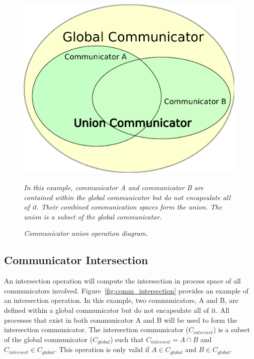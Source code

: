 \documentclass[letterpaper,12pt]{article}
\begin{document}
\begin{figure}[htpb!]
  \centering \includegraphics[width=5in]{union_comm.eps}
  \caption{\sl Communicator union operation diagram.}{\sl In this
    example, communicator A and communicator B are contained within
    the global communicator but do not encapsulate all of it. Their
    combined communication spaces form the union. The union is a
    subset of the global communicator.}
  \label{fig:comm_union}
\end{figure}

\subsection{Communicator Intersection}\label{subsec:comm_intersection}
An intersection operation will compute the intersection in process
space of all communicators
involved. Figure~\ref{fig:comm_intersection} provides an example of an
intersection operation. In this example, two communicators, A and B,
are defined within a global communicator but do not encapsulate all of
it. All processes that exist in both communicator A and B will be used
to form the intersection communicator. The intersection communicator
($C_{intersect}$) is a subset of the global communicator
($C_{global}$) such that $C_{intersect} = A \cap B$ and $C_{intersect}
\in C_{global}$. This operation is only valid if $A \in C_{global}$
and $B \in C_{global}$.
\end{document}
